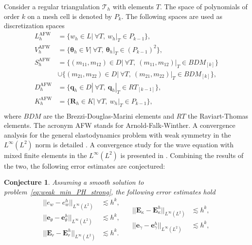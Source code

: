 \documentclass{ifacconf}
\newtheorem{conjecture}{Conjecture}
\begin{document}
Consider a regular triangulation $\mathcal{T}_h$ with elements $T$. The space of polynomials of order $k$ on a mesh cell is denoted by $P_k$. The following spaces are used as discretization spaces
\begin{equation}
\label{eq:AFW}
\begin{aligned}
L_h^{\text{AFW}} &= \{w_h \in L | \ \forall T, \ w_h|_{T} \in P_{k-1} \}, \\
V_h^{\text{AFW}} &= \{\bm{\theta}_h \in V | \ \forall T,\ \bm{\theta}_h|_{T} \in (P_{k-1})^2 \}, \\
S_h^{\text{AFW}} &= \{(m_{11}, m_{12}) \in D| \ \forall T,\ (m_{11}, m_{12})|_{T} \in BDM_{[k]} \}  \\
& \cup \{(m_{21}, m_{22}) \in D| \ \forall T,\ (m_{21}, m_{22})|_{T} \in BDM_{[k]} \}, \\
D_h^{\text{AFW}} &= \{\bm{q}_h \in D | \ \forall T,\ \bm{q}_h|_{T} \in RT_{[k-1]} \}, \\
K_h^{\text{AFW}} &= \{\bm{R}_h \in K | \ \forall T, \ w_h|_{T} \in P_{k-1} \}, \\ 
\end{aligned}
\end{equation}
where $BDM$ are the Brezzi-Douglas-Marini elements and $RT$ the Raviart-Thomas elements. The acronym AFW stands for Arnold-Falk-Winther. A convergence analysis for the general elastodynamics problem with weak symmetry in the $L^\infty (L^2)$ norm is detailed \cite{ArnoldWeak}. A convergence study for the wave equation with mixed finite elements in the $L^\infty (L^2)$ is presented in \cite{Geveci}. Combining the results of the two, the following error estimates are conjectured:
\begin{conjecture}
	Assuming a smooth solution to problem~\eqref{eq:weak_min_PH_strong}, the following error estimates hold 
	\begin{equation}
	\label{eq:errAFW}
	\begin{aligned}
	||e_w - e_w^h||_{L^{\infty}(L^2)} &\lesssim h^{k}, \\
	||\bm{e}_\theta - \bm{e}_\theta^h||_{L^{\infty}(L^2)} &\lesssim h^{k}, \\
	||\bm{E}_r - \bm{E}_r^h||_{L^{\infty}(L^2)} &\lesssim h^{k}. \\
	\end{aligned} \quad
	\begin{aligned}
	||\bm{E}_\kappa - \bm{E}_\kappa^h||_{L^{\infty}(L^2)} &\lesssim  h^{k}, \\
	||\bm{e}_\gamma - \bm{e}_\gamma^ h||_{L^{\infty}(L^2)} &\lesssim  h^{k}, \\
	\end{aligned} 
	\end{equation}
\end{conjecture}
\end{document}
